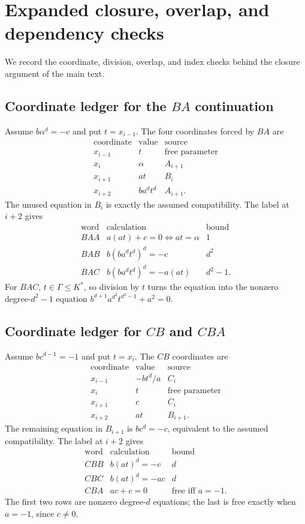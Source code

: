 \documentclass[11pt]{article}
\theoremstyle{definition}
\theoremstyle{remark}
\begin{document}
\section{Expanded closure, overlap, and dependency checks}\label{app:closure}

We record the coordinate, division, overlap, and index checks behind the
closure argument of the main text.

\subsection*{Coordinate ledger for the \(BA\) continuation}

Assume \(b\alpha^d=-c\) and put \(t=x_{i-1}\).  The four coordinates forced
by \(BA\) are
\[
\begin{array}{c|c|l}
\text{coordinate}&\text{value}&\text{source}\\ \hline
x_{i-1}&t&\text{free parameter}\\
x_i&\alpha&A_{i+1}\\
x_{i+1}&at&B_i\\
x_{i+2}&ba^dt^d&A_{i+1}.
\end{array}
\]
The unused equation in \(B_i\) is exactly the assumed compatibility.  The
label at \(i+2\) gives
\[
\begin{array}{c|l|c}
\text{word}&\text{calculation}&\text{bound}\\ \hline
BAA&a(at)+c=0\Longleftrightarrow at=\alpha&1\\
BAB&b(ba^dt^d)^d=-c&d^2\\
BAC&b(ba^dt^d)^d=-a(at)&d^2-1.
\end{array}
\]
For \(BAC\), \(t\in\Gamma\le K^\ast\), so division by \(t\) turns the
equation into the nonzero degree-\(d^2-1\) equation
\(b^{d+1}a^{d^2}t^{d^2-1}+a^2=0\).

\subsection*{Coordinate ledger for \(CB\) and \(CBA\)}

Assume \(bc^{d-1}=-1\) and put \(t=x_i\).  The \(CB\) coordinates are
\[
\begin{array}{c|c|l}
\text{coordinate}&\text{value}&\text{source}\\ \hline
x_{i-1}&-bt^d/a&C_i\\
x_i&t&\text{free parameter}\\
x_{i+1}&c&C_i\\
x_{i+2}&at&B_{i+1}.
\end{array}
\]
The remaining equation in \(B_{i+1}\) is \(bc^d=-c\), equivalent to the
assumed compatibility.  The label at \(i+2\) gives
\[
\begin{array}{c|l|c}
\text{word}&\text{calculation}&\text{bound}\\ \hline
CBB&b(at)^d=-c&d\\
CBC&b(at)^d=-ac&d\\
CBA&ac+c=0&\text{free iff }a=-1.
\end{array}
\]
The first two rows are nonzero degree-\(d\) equations; the last is free
exactly when \(a=-1\), since \(c\ne0\).
\end{document}
